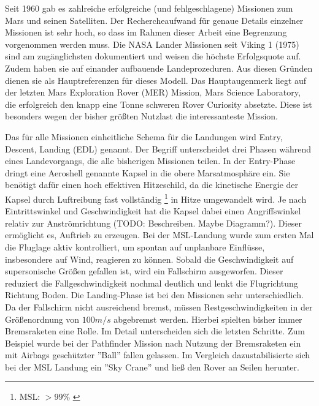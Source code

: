 Seit 1960 gab es zahlreiche erfolgreiche (und fehlgeschlagene) Missionen zum Mars und seinen Satelliten. Der Rechercheaufwand für genaue Details einzelner Missionen ist sehr hoch, so dass im Rahmen dieser Arbeit eine Begrenzung vorgenommen werden muss. Die NASA Lander Missionen seit Viking 1 (1975) sind am zugänglichsten dokumentiert und weisen die höchste Erfolgsquote auf. Zudem haben sie auf einander aufbauende Landeprozeduren. Aus diesen Gründen dienen sie als Hauptreferenzen für dieses Modell. Das Hauptaugenmerk liegt auf der letzten Mars Exploration Rover (MER) Mission, Mars Science Laboratory, die erfolgreich den knapp eine Tonne \cite{Way2007} schweren Rover Curiosity absetzte. Diese ist besonders wegen der bisher größten Nutzlast die interessanteste Mission.

Das für alle Missionen einheitliche Schema für die Landungen wird Entry, Descent, Landing (EDL) genannt. Der Begriff unterscheidet drei Phasen während eines Landevorgangs, die alle bisherigen Missionen teilen. In der Entry-Phase dringt eine Aeroshell genannte Kapsel in die obere Marsatmosphäre ein. Sie benötigt dafür einen hoch effektiven Hitzeschild, da die kinetische Energie der Kapsel durch Luftreibung fast vollständig \footnote{MSL: $>99\%$ \cite{Edquist2009}} in Hitze umgewandelt wird. Je nach Eintrittswinkel und Geschwindigkeit hat die Kapsel dabei einen Angriffswinkel relativ zur Anströmrichtung (TODO: Beschreiben. Maybe Diagramm?). Dieser ermöglicht es, Auftrieb zu erzeugen. Bei der MSL-Landung wurde zum ersten Mal die Fluglage aktiv kontrolliert, um spontan auf unplanbare Einflüsse, insbesondere auf Wind, reagieren zu können.
Sobald die Geschwindigkeit auf supersonische Größen gefallen ist, wird ein Fallschirm ausgeworfen. Dieser reduziert die Fallgeschwindigkeit nochmal deutlich und lenkt die Flugrichtung Richtung Boden. Die Landing-Phase ist bei den Missionen sehr unterschiedlich. Da der Fallschirm nicht ausreichend bremst, müssen Restgeschwindigkeiten in der Größenordnung von $100m/s$ abgebremst werden. Hierbei spielten bisher immer Bremsraketen eine Rolle. Im Detail unterscheiden sich die letzten Schritte. Zum Beispiel wurde bei der Pathfinder Mission nach Nutzung der Bremsraketen ein mit Airbags geschützter ''Ball'' fallen gelassen. Im Vergleich dazustabilisierte sich bei der MSL Landung ein ''Sky Crane'' und ließ den Rover an Seilen herunter.